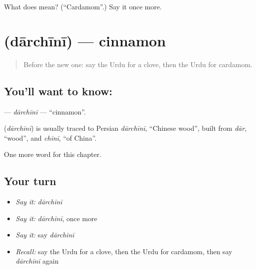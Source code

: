 \begin{tcolorbox}[breakable,colback=teal!4,colframe=teal!35!black,title={Before you move on}]
What does  mean? (\textquotedblleft{}Cardamom\textquotedblright{}.) Say it once more.
\end{tcolorbox}
\section[\texorpdfstring{\ur{دارچینی} (dārchīnī)}{دارچینی (dārchīnī)}]{ (dārchīnī) — cinnamon}

\label{lesson:UR-C207-darchini}



\begin{quote}
Before the new one: say the Urdu for a clove, then the Urdu for cardamom.
\end{quote}

\subsection*{You'll want to know: }
\textbf{} — \emph{dārchīnī} — \textquotedblleft{}cinnamon\textquotedblright{}.

\begin{cousinweb}
\textbf{} (\emph{dārchīnī}) is usually traced to Persian \emph{dārchīnī}, \textquotedblleft{}Chinese wood\textquotedblright{}, built from \emph{dār}, \textquotedblleft{}wood\textquotedblright{}, and \emph{chīnī}, \textquotedblleft{}of China\textquotedblright{}.
\end{cousinweb}

\begin{grammarlens}[title={What you've built}]
One more word for this chapter.
\end{grammarlens}

\subsection*{Your turn}
\begin{itemize}
\raggedright
  \item \emph{Say it:} \emph{dārchīnī}
  \item \emph{Say it:} \emph{dārchīnī}, once more
  \item \emph{Say it:} say \emph{dārchīnī}
  \item \emph{Recall:} say the Urdu for a clove, then the Urdu for cardamom, then say \emph{dārchīnī} again
\end{itemize}

